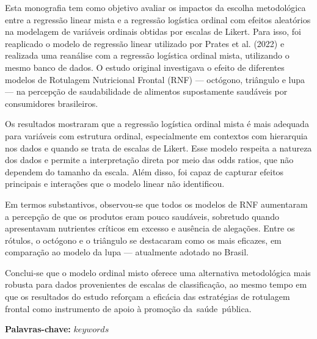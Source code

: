 \begin{spacing}{1.0}
\justify

\setlength{\parindent}{0pt}


Esta monografia tem como objetivo avaliar os impactos da escolha metodológica entre a regressão linear mista e a regressão logística ordinal com efeitos aleatórios na modelagem de variáveis ordinais obtidas por escalas de Likert. Para isso, foi reaplicado o modelo de regressão linear utilizado por Prates et al. (2022) e realizada uma reanálise com a regressão logística ordinal mista, utilizando o mesmo banco de dados. O estudo original investigava o efeito de diferentes modelos de Rotulagem Nutricional Frontal (RNF) — octógono, triângulo e lupa — na percepção de saudabilidade de alimentos supostamente saudáveis por consumidores brasileiros.

Os resultados mostraram que a regressão logística ordinal mista é mais adequada para variáveis com estrutura ordinal, especialmente em contextos com hierarquia nos dados e quando se trata de escalas de Likert. Esse modelo respeita a natureza dos dados e permite a interpretação direta por meio das odds ratios, que não dependem do tamanho da escala. Além disso, foi capaz de capturar efeitos principais e interações que o modelo linear não identificou.

Em termos substantivos, observou-se que todos os modelos de RNF aumentaram a percepção de que os produtos eram pouco saudáveis, sobretudo quando apresentavam nutrientes críticos em excesso e ausência de alegações. Entre os rótulos, o octógono e o triângulo se destacaram como os mais eficazes, em comparação ao modelo da lupa — atualmente adotado no Brasil.

Conclui-se que o modelo ordinal misto oferece uma alternativa metodológica mais robusta para dados provenientes de escalas de classificação, ao mesmo tempo em que os resultados do estudo reforçam a eficácia das estratégias de rotulagem frontal como instrumento de apoio à promoção da saúde pública.

\textbf{Palavras-chave:} $keywords$

\setlength{\parindent}{15pt}

\end{spacing}

\newpage
\renewcommand{\listfigurename}{LISTA DE FIGURAS}
\pagestyle{fancy}
\listoffigures

\newpage
\renewcommand{\listtablename}{LISTA DE TABELAS}
\pagestyle{fancy}
\listoftables

\newpage
\renewcommand{\contentsname}{SUMÁRIO}
\pagestyle{fancy}
\tableofcontents

\newpage
{}